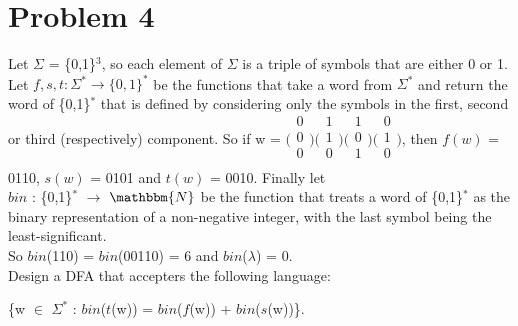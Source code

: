 \documentclass{article}
\newcommand*\moveToRight[1]{\hspace*{0em plus 1fill}\makebox{(#1)}}
\begin{document}
\section{Problem 4}
Let $\Sigma$ = \{0,1\}$^3$, so each element of $\Sigma$ is a triple of symbols that are either 0 or 1.\\ Let $f, s, t : \Sigma^* \to \{0, 1\}^*$ be the functions that take a word from $\Sigma^*$ and return the word of \{0,1\}$^*$ that is defined by considering only the symbols in the first, second or third (respectively) component. So if w = 
$\bigl(\begin{smallmatrix}
    0\\
    0\\
    0\\
\end{smallmatrix}\bigr)
\bigl(\begin{smallmatrix}
    1\\
    1\\
    0\\
\end{smallmatrix}\bigr)
\bigl(\begin{smallmatrix}
    1\\
    0\\
    1\\
\end{smallmatrix}\bigr)
\bigl(\begin{smallmatrix}
    0\\
    1\\
    0\\
\end{smallmatrix}\bigr)$, then $f(w)$ = 0110, $s(w)$ = 0101 and $t(w)$ = 0010. Finally let \\$bin$ : \{0,1\}$^*$ $\to$ $\mathbbm{N}$ be the function that treats a word of \{0,1\}$^*$ as the binary representation of a non-negative integer, with the last symbol being the least-significant.\\ So $bin$(110) = $bin$(00110) = 6 and $bin$($\lambda$) = 0.\\
Design a DFA that accepters the following language:
\begin{center}
\{w $\in$ $\Sigma^*$ : $bin$($t$(w)) = $bin$($f$(w)) + $bin$($s$(w))\}.\\ \moveToRight{10 marks}\\    
\end{center}

\newpage
\end{document}
